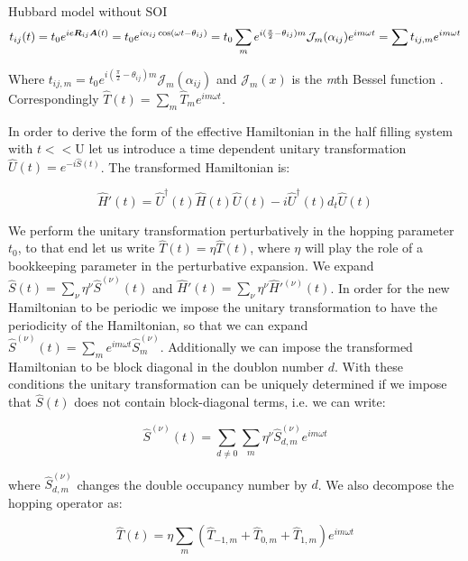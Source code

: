 \begin{section}{Hubbard model without SOI}
\begin{align*}
t_{ij}(t) = t_0e^{ie\boldsymbol{R}_{ij}\boldsymbol{A}(t)} = t_0e^{i\alpha_{ij} \cos(\omega t - \theta_{ij})} = t_0 \sum_m e^{i(\frac{\pi}{2}-\theta_{ij})m} \mathcal{J}_m(\alpha_{ij}) e^{im\omega t} = \sum t_{ij,m} e^{im\omega t}
\end{align*}

Where $t_{ij,m} = t_0 e^{i(\frac{\pi}{2}-\theta_{ij})m} \mathcal{J}_m(\alpha_{ij})$ and $\mathcal{J}_m(x)$ is the \textit{m}th Bessel function \cite{Kitamura2017}. Correspondingly $\hat{T}(t) = \sum_m \hat{T}_m e^{im \omega t}$.

In order to derive the form of the effective Hamiltonian in the half filling system with $t << \text{U}$ let us introduce a time dependent unitary transformation $\hat{U}(t) = e^{-i\hat{S}(t)}$. The transformed Hamiltonian is:

\begin{equation}
\hat{H}'(t) = \hat{U}^\dagger (t) \hat{H}(t) \hat{U}(t) - i\hat{U}^\dagger(t) d_t \hat{U}(t)
\end{equation} 

We perform the unitary transformation perturbatively in the hopping parameter $t_0$, to that end let us write $\hat{T}(t) = \eta \hat{T}(t)$, where $\eta$ will play the role of a bookkeeping parameter in the perturbative expansion. We expand $\hat{S}(t) = \sum_\nu \eta^\nu \hat{S}^{(\nu)}(t)$ and $\hat{H}'(t) = \sum_\nu \eta^\nu \hat{H}'^{(\nu)}(t)$. In order for the new Hamiltonian to be periodic we impose the unitary transformation to have the periodicity of the Hamiltonian, so that we can expand $\hat{S}^{(\nu)}(t) = \sum_m e^{im\omega t}\hat{S}^{(\nu)}_m$. Additionally we can impose the transformed Hamiltonian to be block diagonal in the doublon number $d$. With these conditions the unitary transformation can be uniquely determined if we impose that $\hat{S}(t)$ does not contain block-diagonal terms, i.e. we can write:

\begin{equation}
\hat{S}^{(\nu)}(t) = \sum_{d \neq 0} \sum_m \eta^\nu \hat{S}^{(\nu)}_{d,m} e^{im\omega t}
\end{equation}

where $\hat{S}^{(\nu)}_{d,m}$ changes the double occupancy number by $d$. We also decompose the hopping operator as:

\begin{equation}
\hat{T}(t) = \eta \sum_m (\hat{T}_{-1,m}+\hat{T}_{0,m}+\hat{T}_{1,m})e^{im\omega t}
\end{equation}


\end{section}
